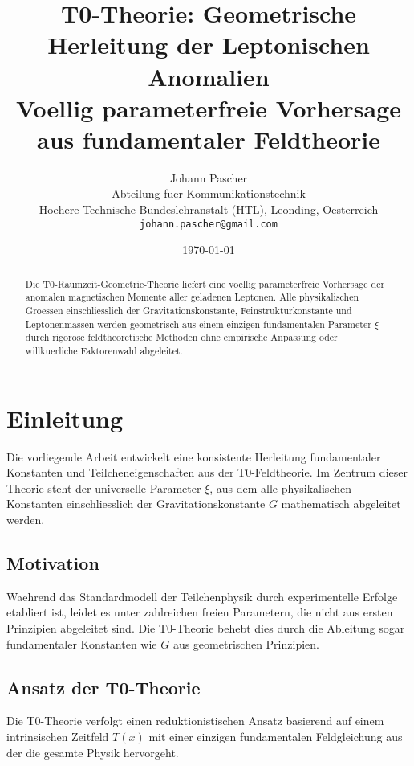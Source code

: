 \documentclass[12pt,a4paper]{article}
\newcommand{\xipar}{\xi}
\begin{document}
	
	\title{T0-Theorie: Geometrische Herleitung der Leptonischen Anomalien \\
		\large Voellig parameterfreie Vorhersage aus fundamentaler Feldtheorie}
	\author{Johann Pascher\\
		Abteilung fuer Kommunikationstechnik\\
		Hoehere Technische Bundeslehranstalt (HTL), Leonding, Oesterreich\\
		\texttt{johann.pascher@gmail.com}}
	\date{\today}
	
	\maketitle
	
	\begin{abstract}
		Die T0-Raumzeit-Geometrie-Theorie liefert eine voellig parameterfreie Vorhersage der anomalen magnetischen Momente aller geladenen Leptonen. Alle physikalischen Groessen einschliesslich der Gravitationskonstante, Feinstrukturkonstante und Leptonenmassen werden geometrisch aus einem einzigen fundamentalen Parameter $\xipar$ durch rigorose feldtheoretische Methoden ohne empirische Anpassung oder willkuerliche Faktorenwahl abgeleitet.
	\end{abstract}
	
	\tableofcontents
	\newpage
	
	\section{Einleitung}
	
	Die vorliegende Arbeit entwickelt eine konsistente Herleitung fundamentaler Konstanten und Teilcheneigenschaften aus der T0-Feldtheorie. Im Zentrum dieser Theorie steht der universelle Parameter $\xi$, aus dem alle physikalischen Konstanten einschliesslich der Gravitationskonstante $G$ mathematisch abgeleitet werden.
	
	\subsection{Motivation}
	Waehrend das Standardmodell der Teilchenphysik durch experimentelle Erfolge etabliert ist, leidet es unter zahlreichen freien Parametern, die nicht aus ersten Prinzipien abgeleitet sind. Die T0-Theorie behebt dies durch die Ableitung sogar fundamentaler Konstanten wie $G$ aus geometrischen Prinzipien.
	
	\subsection{Ansatz der T0-Theorie}
	Die T0-Theorie verfolgt einen reduktionistischen Ansatz basierend auf einem intrinsischen Zeitfeld $T(x)$ mit einer einzigen fundamentalen Feldgleichung aus der die gesamte Physik hervorgeht.
	
\end{document}
